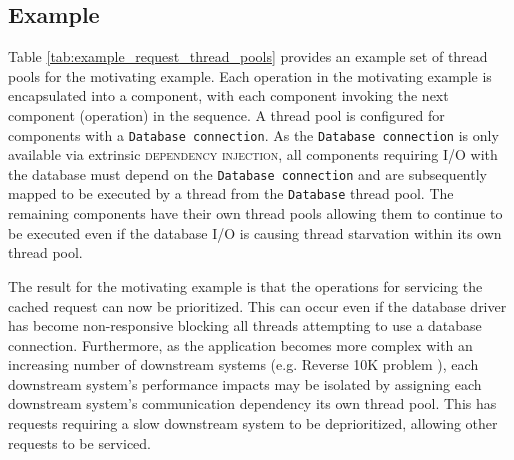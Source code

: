 \documentclass[prodmode]{style/acmlarge}
\begin{document}
\subsection{Example}

Table \ref{tab:example_request_thread_pools} provides an example set of thread
pools for the motivating example.  Each operation in the motivating example is
encapsulated into a component, with each component invoking the next component
(operation) in the sequence.  A thread pool is configured for components with a
\texttt{Database connection}.  As the \texttt{Database connection} is only
available via extrinsic \textsc{dependency injection}, all components requiring
I/O with the database must depend on the \texttt{Database connection} and are
subsequently mapped to be executed by a thread from the \texttt{Database} thread
pool.  The remaining components have their own thread pools allowing them to
continue to be executed even if the database I/O is causing thread starvation
within its own thread pool.

\begin{table}[t]
\label{tab:example_request_thread_pools}
\end{table}

The result for the motivating example is that the operations for servicing the
cached request can now be prioritized.  This can occur even if the database
driver has become non-responsive blocking all threads attempting to use a
database connection.  Furthermore, as the application becomes more complex with
an increasing number of downstream systems (e.g. Reverse 10K problem
\cite{reverse-ten-k-problem}), each downstream system's performance impacts may
be isolated by assigning each downstream system's communication dependency its
own thread pool.  This has requests requiring a slow downstream system to be
deprioritized, allowing other requests to be serviced.
\end{document}
